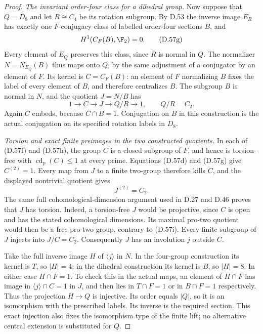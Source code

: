 \begin{proof}
\emph{The invariant order-four class for a dihedral group.}
Now suppose that $Q=D_8$ and let
$R\cong C_4$ be its rotation subgroup.
By D.53 the inverse image $E_R$ has
exactly one $F$-conjugacy class of
labelled order-four sections $B$,
and
\[
                         H^1(C_F(B),\F_2)=0.             \tag{D.57g}
\]
Every element of $E_Q$ preserves this
class, since $R$ is normal in $Q$.
The normalizer $N=N_{E_Q}(B)$ thus
maps onto $Q$, by the same adjustment
of a conjugator by an element of $F$.
Its kernel is $C=C_F(B)$: an element
of $F$ normalizing $B$ fixes the label
of every element of $B$, and therefore
centralizes $B$.
The subgroup $B$ is normal in $N$,
and the quotient $J=N/B$ has
\[
                  1\longrightarrow C\longrightarrow J
                        \longrightarrow Q/R\longrightarrow1,
                              \qquad Q/R=C_2.           \tag{D.57h}
\]
Again $C$ embeds, because $C\cap B=1$.
Conjugation on $B$ in this construction
is the actual conjugation on its
specified rotation labels in $D_8$.

\emph{Torsion and exact finite preimages in the two constructed quotients.}
In each of (D.57f) and (D.57h), the
group $C$ is a closed subgroup of
$F$, and hence is torsion-free with
$\operatorname{cd}_p(C)\leq1$ at every
prime. Equations (D.57d) and (D.57g)
give $C^{(2)}=1$.
Every map from $J$ to a finite two-group
therefore kills $C$, and the displayed
nontrivial quotient gives
\[
                              J^{(2)}=C_2.              \tag{D.57i}
\]
The same full cohomological-dimension
argument used in D.27 and D.46 proves
that $J$ has torsion. Indeed, a
torsion-free $J$ would be projective,
since $C$ is open and has the stated
cohomological dimensions. Its maximal
pro-two quotient would then be a free
pro-two group, contrary to (D.57i).
Every finite subgroup of $J$ injects
into $J/C=C_2$. Consequently $J$ has
an involution $j$ outside $C$.

Take the full inverse image $H$ of
$\langle j\rangle$ in $N$.
In the four-group construction its
kernel is $T$, so $|H|=4$; in the
dihedral construction its kernel is
$B$, so $|H|=8$.
In either case $H\cap F=1$.
To check this in the actual maps,
an element of $H\cap F$ has image
in $\langle j\rangle\cap C=1$ in
$J$, and then lies in $T\cap F=1$
or in $B\cap F=1$ respectively.
Thus the projection $H\to Q$ is
injective. Its order equals $|Q|$,
so it is an isomorphism with the
prescribed labels.
Its inverse is the required section.
This exact injection also fixes the
isomorphism type of the finite lift;
no alternative central extension
is substituted for $Q$.


\end{proof}
